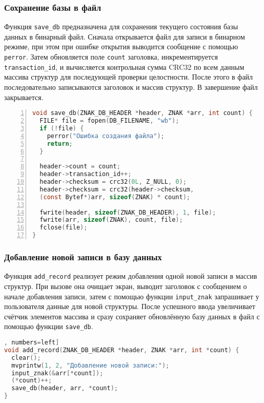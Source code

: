 \subsubsection*{Сохранение базы в файл}

Функция \texttt{save\_db} предназначена для сохранения текущего состояния базы данных в бинарный файл. Сначала открывается файл для записи в бинарном режиме, при этом при ошибке открытия выводится сообщение с помощью \texttt{perror}. Затем обновляется поле \texttt{count} заголовка, инкрементируется \texttt{transaction\_id}, и вычисляется контрольная сумма CRC32 по всем данным массива структур для последующей проверки целостности. После этого в файл последовательно записываются заголовок и массив структур. В завершение файл закрывается.

\begin{lstlisting}[language=C, caption=Функция save\_db, numbers=left]
void save_db(ZNAK_DB_HEADER *header, ZNAK *arr, int count) {
  FILE* file = fopen(DB_FILENAME, "wb");
  if (!file) {
    perror("Ошибка создания файла");
    return;
  }

  header->count = count;
  header->transaction_id++;
  header->checksum = crc32(0L, Z_NULL, 0);
  header->checksum = crc32(header->checksum, 
  (const Bytef*)arr, sizeof(ZNAK) * count);

  fwrite(header, sizeof(ZNAK_DB_HEADER), 1, file);
  fwrite(arr, sizeof(ZNAK), count, file);
  fclose(file);
}
\end{lstlisting}

\subsubsection*{Добавление новой записи в базу данных}

Функция \texttt{add\_record} реализует режим добавления одной новой записи в массив структур. При вызове она очищает экран, выводит заголовок с сообщением о начале добавления записи, затем с помощью функции \texttt{input\_znak} запрашивает у пользователя данные для новой структуры. После успешного ввода увеличивает счётчик элементов массива и сразу сохраняет обновлённую базу данных в файл с помощью функции \texttt{save\_db}.

\begin{lstlisting}[language=C, caption=Функция add\_record], numbers=left]
void add_record(ZNAK_DB_HEADER *header, ZNAK *arr, int *count) {
  clear();
  mvprintw(1, 2, "Добавление новой записи:");
  input_znak(&arr[*count]);
  (*count)++;
  save_db(header, arr, *count);
}
\end{lstlisting}

